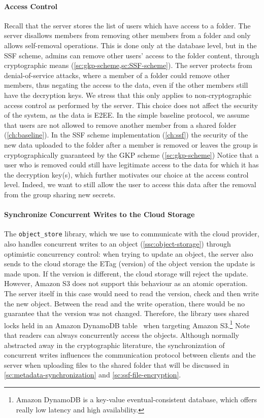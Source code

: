 \paragraph{Access Control}
Recall that the server stores the list of users which have access to
a folder. 
The server disallows members from removing other members from a folder and only allows self-removal operations.
This is done only at the database level, but
in the SSF scheme, admins can remove other users'
access to the folder content, through cryptographic means
(\cref{sc:gkp-scheme,sc:SSF-scheme}).
The server protects from denial-of-service attacks,
where a member of a folder could remove other members,
thus negating the access to the data, even if the other
members still have the decryption keys.
We stress that this only applies to non-cryptographic
access control as performed
by the server.
This choice does not affect the security of the system,
as the data is E2EE.
In the simple baseline protocol,
we assume that users are not allowed to
remove another member from a shared folder (\cref{ch:baseline}).
In the SSF scheme implementation (\cref{ch:ssf})
the security of the new data uploaded to the folder
after a member is removed or leaves the group
is cryptographically guaranteed by the GKP scheme (\cref{sc:gkp-scheme})
Notice that a user who is removed could still
have legitimate access to the data for which
it has the decryption key(s), which further motivates
our choice at the access control level. Indeed, we want
to still allow the user to access this data after the removal
from the group sharing new secrets.


\paragraph{Synchronize Concurrent Writes to the Cloud Storage}\label{sc:ssf-file-changes-sync}
The \texttt{object\_store} library, which
we use to communicate with the cloud provider,
also handles concurrent writes
to an object (\cref{ssc:object-storage})
through optimistic concurrency control:
when trying to update an object,
the server also sends to the cloud storage the
ETag (version)
of the object version the update is made upon.
If the version is different, 
the cloud storage will reject the update.
However, Amazon S3 does not support this 
behaviour as an atomic operation. 
The server itself in this case would need to read the version,
check and then write the new object.
Between the read and the write operation,
there would be no guarantee that the version was not changed.
Therefore, the library uses shared locks held in an Amazon DynamoDB 
table~\cite{objectStoreCommitProtocol} when targeting Amazon S3.\footnote{Amazon DynamoDB is a key-value eventual-consistent database, which offers really low latency and high availability.}
Note that readers can always concurrently access the objects. 
Although normally abstracted away in the cryptographic
literature, the synchronization of concurrent writes
influences the communication protocol
between clients and the server when uploading
files to the shared folder 
that will be discussed in
\cref{sc:metadata-synchronization}
and \cref{sc:ssf-file-encryption}.

